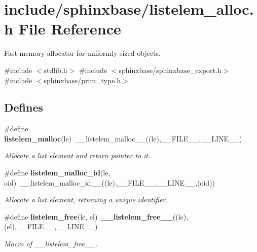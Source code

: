 \section{include/sphinxbase/listelem\-\_\-alloc.h \-File \-Reference}
\label{listelem__alloc_8h}


\-Fast memory allocator for uniformly sized objects.  


{\ttfamily \#include $<$stdlib.\-h$>$}\*
{\ttfamily \#include $<$sphinxbase/sphinxbase\-\_\-export.\-h$>$}\*
{\ttfamily \#include $<$sphinxbase/prim\-\_\-type.\-h$>$}\*
\subsection*{\-Defines}
\begin{DoxyCompactItemize}
\item 
\#define {\bf listelem\-\_\-malloc}(le)~\-\_\-\-\_\-listelem\-\_\-malloc\-\_\-\-\_\-((le),\-\_\-\-\_\-\-F\-I\-L\-E\-\_\-\-\_\-,\-\_\-\-\_\-\-L\-I\-N\-E\-\_\-\-\_\-)\label{listelem__alloc_8h_ad0c40e65d9cca0d7ec08fcf416b09af2}

\begin{DoxyCompactList}\small\item\em \-Allocate a list element and return pointer to it. \end{DoxyCompactList}\item 
\#define {\bf listelem\-\_\-malloc\-\_\-id}(le, oid)~\-\_\-\-\_\-listelem\-\_\-malloc\-\_\-id\-\_\-\-\_\-((le),\-\_\-\-\_\-\-F\-I\-L\-E\-\_\-\-\_\-,\-\_\-\-\_\-\-L\-I\-N\-E\-\_\-\-\_\-,(oid))\label{listelem__alloc_8h_aa9bbb7161aceacdba49b41b189554507}

\begin{DoxyCompactList}\small\item\em \-Allocate a list element, returning a unique identifier. \end{DoxyCompactList}\item 
\#define {\bf listelem\-\_\-free}(le, el)~{\bf \-\_\-\-\_\-listelem\-\_\-free\-\_\-\-\_\-}((le),(el),\-\_\-\-\_\-\-F\-I\-L\-E\-\_\-\-\_\-,\-\_\-\-\_\-\-L\-I\-N\-E\-\_\-\-\_\-)\label{listelem__alloc_8h_a67de661d7ca552347fa6f03005e25d74}

\begin{DoxyCompactList}\small\item\em \-Macro of \-\_\-\-\_\-listelem\-\_\-free\-\_\-\-\_\-. \end{DoxyCompactList}\end{DoxyCompactItemize}
